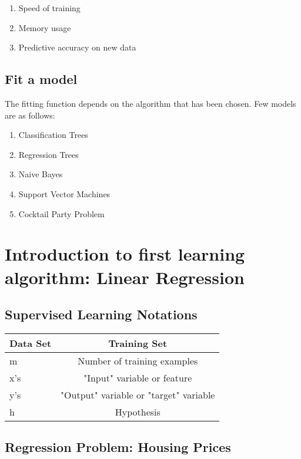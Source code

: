 \documentclass[a4paper, 12pt]{article}
\begin{document}
\begin{enumerate}
\item Speed of training
\item Memory usage
\item Predictive accuracy on new data
\end{enumerate}

\subsection{Fit a model}
The fitting function depends on the algorithm that has been chosen. Few models are as follows:

\begin{enumerate}
\item Classification Trees
\item Regression Trees
\item Naive Bayes 
\item Support Vector Machines
\item Cocktail Party Problem

\end{enumerate}

\section{Introduction to first learning algorithm: Linear Regression}

\subsection{Supervised Learning Notations}

\begin{center}
  \begin{tabular}{ l | c }
    \hline
    Data Set & Training Set \\ \hline
    m & Number of training examples\\ \hline
    x's & "Input" variable or feature \\ \hline
    y's & "Output" variable or "target" variable\\ \hline
    h & Hypothesis\\ \hline
  \end{tabular}
\end{center}

\subsection{Regression Problem: Housing Prices}
\end{document}
